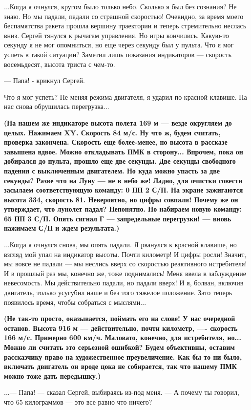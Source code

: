 \documentclass[11pt,a4paper,oneside]{article}
\begin{document}
...Когда я очнулся, кругом было только небо. Сколько я был без сознания? Не знаю. Но мы падали, падали со страшной скоростью! Очевидно, за время моего беспамятства ракета прошла вершину траектории и теперь стремительно неслась вниз. Сергей тянулся к рычагам управления. Но игры кончились. Какую-то секунду я не мог опомниться, но еще через секунду был у пульта. Что я мог успеть в такой ситуации? Заметил лишь показания индикаторов — скорость восемьдесят, высота триста с чем-то.

— Папа! - крикнул Сергей.

Что я мог успеть? Не меняя режима двигателя, я ударил по красной клавише. На нас снова обрушилась перегрузка...

\textbf{
(На нашем же индикаторе высота полета 169 м — везде округляем до целых. Нажимаем XY. Скорость 84 м/с. Ну что ж, будем считать, проверка закончена. Скорость еще более-менее, но высота в рассказе завышена вдвое. Можно откладывать ПМК в сторону... Впрочем, пока он добирался до пульта, прошло еще две секунды. Две секунды свободного падения с выключенным двигателем. Но куда можно упасть за две секунды? Разве что на Луну — не в небо же! Ладно, для очистки совести засылаем соответствующую команду: 0 ПП 2 С/П. На экране зажигаются высота 334, скорость 81. Невероятно, но цифры совпали! Почему же он утверждает, что лунолет падал? Непонятно. Но набираем новую команду: 65 ПП 3 С/П. Опять сигнал Г — запредельные перегрузки! — вновь нажимаем С/П и ждем результата.)}

...Когда я очнулся снова, мы опять падали. Я рванулся к красной клавише, но взгляд мой упал на индикатор высоты. Почти километр! И цифры росли! Значит, мы вовсе не падали — мы неслись вверх со скоростью реактивного истребителя! И в прошлый раз мы, конечно же, тоже поднимались! Меня ввела в заблуждение невесомость. Мы действительно падали, но падали вверх! И я, болван, включив двигатель, только усугубил наше и без того тяжелое положение. Зато теперь появилось время, чтобы собраться с мыслями...

\textbf{
(Не так-то просто, оказывается, поймать его на слове! У нас очередной останов. Высота 916 м — действительно, почти километр, —- скорость 166 м/с. Примерно 600 км/ч. Маловато, конечно, для истребителя, но... Можно ли считать это серьезной ошибкой? Будем объективны, оставим рассказчику право на художественное преувеличение. Как бы то ни было, включать двигатель он вроде цока не собирается, так что нашему ПМК можно тоже дать передышку.)}

...— Папа! — сказал Сергей, выбираясь из-под меня. — А почему ты говорил, что 65 килограммов — это все равно что ничего?
\end{document}
